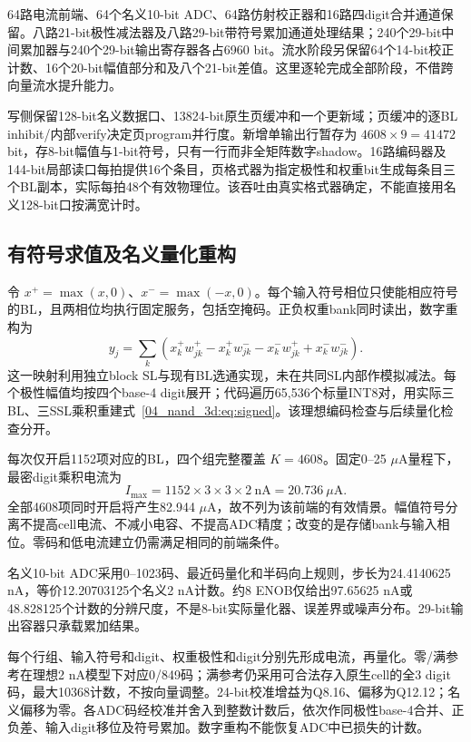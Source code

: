 64路电流前端、64个名义10-bit ADC、64路仿射校正器和16路四digit合并通道保留。八路21-bit极性减法器及八路29-bit带符号累加通道处理结果；240个29-bit中间累加器与240个29-bit输出寄存器各占6960 bit。流水阶段另保留64个14-bit校正计数、16个20-bit幅值部分和及八个21-bit差值。这里逐轮完成全部阶段，不借跨向量流水提升能力。

写侧保留128-bit名义数据口、13824-bit原生页缓冲和一个更新域；页缓冲的逐BL inhibit/内部verify决定页program并行度。新增单输出行暂存为 $4608\times9=41472$ bit，存8-bit幅值与1-bit符号，只有一行而非全矩阵数字shadow。16路编码器及144-bit局部读口每拍提供16个条目，页格式器为指定极性和权重bit生成每条目三个BL副本，实际每拍48个有效物理位。该吞吐由真实格式器确定，不能直接用名义128-bit口按满宽计时。

\subsection{有符号求值及名义量化重构}

令 $x^+=\max(x,0)$、$x^-=\max(-x,0)$。每个输入符号相位只使能相应符号的BL，且两相位均执行固定服务，包括空掩码。正负权重bank同时读出，数字重构为
\begin{equation}
 y_j=\sum_k\left(x_k^+w_{jk}^+-x_k^+w_{jk}^- -x_k^-w_{jk}^+ +x_k^-w_{jk}^-\right).
 \label{04_nand_3d:eq:signed}
\end{equation}
这一映射利用独立block SL与现有BL选通实现，未在共同SL内部作模拟减法。每个极性幅值均按四个base-4 digit展开；代码遍历65,536个标量INT8对，用实际三BL、三SSL乘积重建式~\ref{04_nand_3d:eq:signed}。该理想编码检查与后续量化检查分开。

每次仅开启1152项对应的BL，四个组完整覆盖 $K=4608$。固定0--25 $\mu$A量程下，最密digit乘积电流为
\[
 I_{\max}=1152\times3\times3\times2\ \mathrm{nA}=20.736\ \mu\mathrm{A}.
\]
全部4608项同时开启将产生82.944 $\mu$A，故不列为该前端的有效情景。幅值符号分离不提高cell电流、不减小电容、不提高ADC精度；改变的是存储bank与输入相位。零码和低电流建立仍需满足相同的前端条件。

名义10-bit ADC采用0--1023码、最近码量化和半码向上规则，步长为24.4140625 nA，等价12.20703125个名义2 nA计数。约8 ENOB仅给出97.65625 nA或48.828125个计数的分辨尺度，不是8-bit实际量化器、误差界或噪声分布。29-bit输出容器只承载累加结果。

每个行组、输入符号和digit、权重极性和digit分别先形成电流，再量化。零/满参考在理想2 nA模型下对应0/849码；满参考仍采用可合法存入原生cell的全3 digit码，最大10368计数，不按向量调整。24-bit校准增益为Q8.16、偏移为Q12.12；名义偏移为零。各ADC码经校准并舍入到整数计数后，依次作同极性base-4合并、正负差、输入digit移位及符号累加。数字重构不能恢复ADC中已损失的计数。

